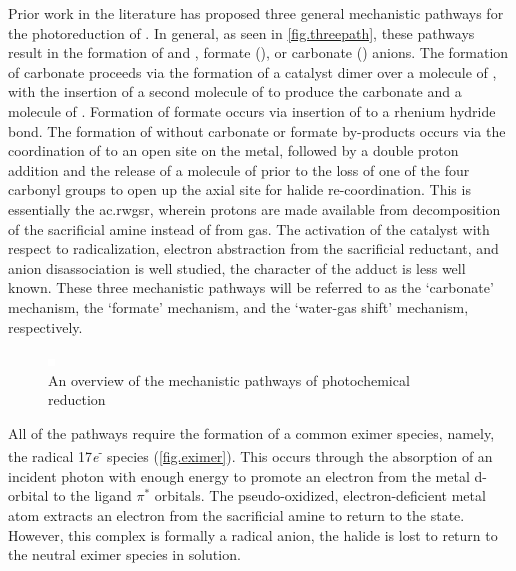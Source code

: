 Prior work in the literature has proposed three general mechanistic pathways for the photoreduction of . In general, as seen in \autoref{fig.threepath}, these pathways result in the formation of  and , formate (), or carbonate () anions. The formation of carbonate proceeds via the formation of a catalyst dimer over a molecule of , with the insertion of a second molecule of  to produce the carbonate and a molecule of . Formation of formate occurs via insertion of  to a rhenium hydride bond. The formation of  without carbonate or formate by-products occurs via the coordination of  to an open site on the metal, followed by a double proton addition and the release of a molecule of  prior to the loss of one of the four carbonyl groups to open up the axial site for halide re-coordination. This is essentially the \gls{ac.rwgsr}, wherein protons are made available from decomposition of the sacrificial amine instead of from  gas. The activation of the catalyst with respect to radicalization, electron abstraction from the sacrificial reductant, and anion disassociation is well studied, the character of the  adduct is less well known. These three mechanistic pathways will be referred to as the `carbonate' mechanism, the `formate' mechanism, and the `water-gas shift' mechanism, respectively.

\begin{figure}[!htb]
 \begin{center}
  \includegraphics[clip=true, keepaspectratio]{images/insertgraphic.eps}
 \end{center}
\caption[Overview of mechanistic pathways]{An overview of the mechanistic pathways of photochemical  reduction}
\label{fig.threepath}
\end{figure} 

All of the pathways require the formation of a common eximer species, namely, the radical 17\textit{e}\textsuperscript{-} species (\autoref{fig.eximer}). This occurs through the absorption of an incident photon with enough energy to promote an electron from the metal d-orbital to the ligand $\pi^\ast$ orbitals. The pseudo-oxidized, electron-deficient metal atom extracts an electron from the sacrificial amine to return to the  state. However, this complex is formally a radical anion, the halide is lost to return to the neutral eximer species in solution. 

